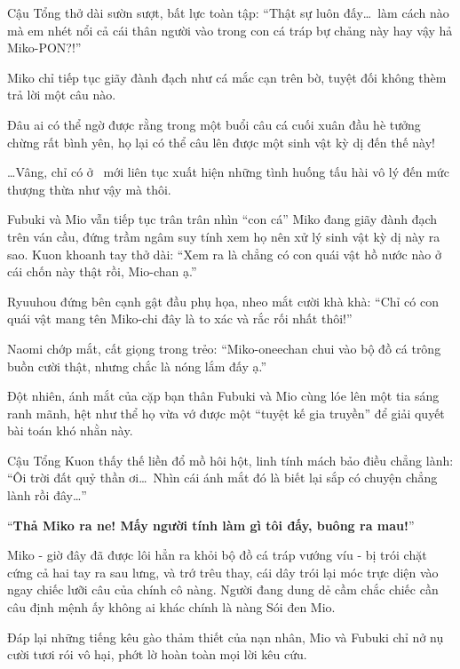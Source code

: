 \documentclass[../main.tex]{subfiles}
\begin{document}

Cậu Tổng thở dài sườn sượt, bất lực toàn tập: ``Thật sự luôn đấy\dots\ làm cách nào mà em nhét nổi cả cái thân người vào trong con cá tráp bự chảng này hay vậy hả Miko-PON?!''

Miko chỉ tiếp tục giãy đành đạch như cá mắc cạn trên bờ, tuyệt đối không thèm trả lời một câu nào.

Đâu ai có thể ngờ được rằng trong một buổi câu cá cuối xuân đầu hè tưởng chừng rất bình yên, họ lại có thể câu lên được một sinh vật kỳ dị đến thế này!

\dots Vâng, chỉ có ở \hll\ mới liên tục xuất hiện những tình huống tấu hài vô lý đến mức thượng thừa như vậy mà thôi.

\omk

Fubuki và Mio vẫn tiếp tục trân trân nhìn ``con cá'' Miko đang giãy đành đạch trên ván cầu, đứng trầm ngâm suy tính xem họ nên xử lý sinh vật kỳ dị này ra sao. Kuon khoanh tay thở dài: ``Xem ra là chẳng có con quái vật hồ nước nào ở cái chốn này thật rồi, Mio-chan ạ.''

Ryuuhou đứng bên cạnh gật đầu phụ họa, nheo mắt cười khà khà: ``Chỉ có con quái vật mang tên Miko-chi đây là to xác và rắc rối nhất thôi!''

Naomi chớp mắt, cất giọng trong trẻo: ``Miko-oneechan chui vào bộ đồ cá trông buồn cười thật, nhưng chắc là nóng lắm đấy ạ.''

Đột nhiên, ánh mắt của cặp bạn thân Fubuki và Mio cùng lóe lên một tia sáng ranh mãnh, hệt như thể họ vừa vớ được một ``tuyệt kế gia truyền'' để giải quyết bài toán khó nhằn này.

Cậu Tổng Kuon thấy thế liền đổ mồ hôi hột, linh tính mách bảo điều chẳng lành: ``Ôi trời đất quỷ thần ơi\dots\ Nhìn cái ánh mắt đó là biết lại sắp có chuyện chẳng lành rồi đây\dots''

\ct

``\textbf{Thả Miko ra ne! Mấy người tính làm gì tôi đấy, buông ra mau!}''

Miko - giờ đây đã được lôi hẳn ra khỏi bộ đồ cá tráp vướng víu - bị trói chặt cứng cả hai tay ra sau lưng, và trớ trêu thay, cái dây trói lại móc trực diện vào ngay chiếc lưỡi câu của chính cô nàng. Người đang dung dẻ cầm chắc chiếc cần câu định mệnh ấy không ai khác chính là nàng Sói đen Mio.

Đáp lại những tiếng kêu gào thảm thiết của nạn nhân, Mio và Fubuki chỉ nở nụ cười tươi rói vô hại, phớt lờ hoàn toàn mọi lời kêu cứu.
\end{document}
